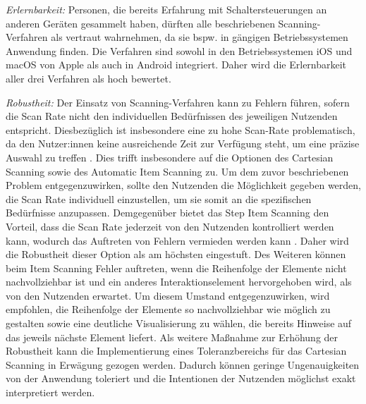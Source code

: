 \textit{Erlernbarkeit:}
Personen, die bereits Erfahrung mit Schaltersteuerungen an anderen Geräten gesammelt haben, dürften alle beschriebenen Scanning-Verfahren als vertraut wahrnehmen, da sie bspw. in gängigen Betriebssystemen Anwendung finden. Die Verfahren sind sowohl in den Betriebssystemen iOS und macOS von Apple \citep{apple_einfuhrung_2024} als auch in Android \citep{noauthor_tips_nodate} integriert. Daher wird die Erlernbarkeit aller drei Verfahren als hoch bewertet.

\textit{Robustheit:}
Der Einsatz von Scanning-Verfahren kann zu Fehlern führen, sofern die Scan Rate nicht den individuellen Bedürfnissen des jeweiligen Nutzenden entspricht. Diesbezüglich ist insbesondere eine zu hohe Scan-Rate problematisch, da den Nutzer:innen keine ausreichende Zeit zur Verfügung steht, um eine präzise Auswahl zu treffen \citep{cook_chapter_2015}. Dies trifft insbesondere auf die Optionen des Cartesian Scanning sowie des Automatic Item Scanning zu. Um dem zuvor beschriebenen Problem entgegenzuwirken, sollte den Nutzenden die Möglichkeit gegeben werden, die Scan Rate individuell einzustellen, um sie somit an die spezifischen Bedürfnisse anzupassen. 
Demgegenüber bietet das Step Item Scanning den Vorteil, dass die Scan Rate jederzeit von den Nutzenden kontrolliert werden kann, wodurch das Auftreten von Fehlern vermieden werden kann \citep{cook_chapter_2015}. Daher wird die Robustheit dieser Option als am höchsten eingestuft. 
Des Weiteren können beim Item Scanning Fehler auftreten, wenn die Reihenfolge der Elemente nicht nachvollziehbar ist und ein anderes Interaktionselement hervorgehoben wird, als von den Nutzenden erwartet. Um diesem Umstand entgegenzuwirken, wird empfohlen, die Reihenfolge der Elemente so nachvollziehbar wie möglich zu gestalten sowie eine deutliche Visualisierung zu wählen, die bereits Hinweise auf das jeweils nächste Element liefert.
Als weitere Maßnahme zur Erhöhung der Robustheit kann die Implementierung eines Toleranzbereichs für das Cartesian Scanning in Erwägung gezogen werden. Dadurch können geringe Ungenauigkeiten von der Anwendung toleriert und die Intentionen der Nutzenden möglichst exakt interpretiert werden.

